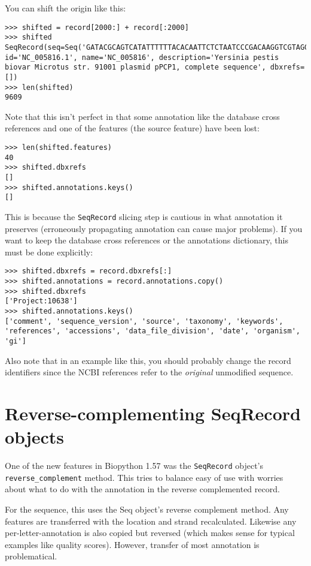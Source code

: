 You can shift the origin like this:

\begin{verbatim}
>>> shifted = record[2000:] + record[:2000]
>>> shifted
SeqRecord(seq=Seq('GATACGCAGTCATATTTTTTACACAATTCTCTAATCCCGACAAGGTCGTAGGTC...GGA'), id='NC_005816.1', name='NC_005816', description='Yersinia pestis biovar Microtus str. 91001 plasmid pPCP1, complete sequence', dbxrefs=[])
>>> len(shifted)
9609
\end{verbatim}

Note that this isn't perfect in that some annotation like the database cross references
and one of the features (the source feature) have been lost:

\begin{verbatim}
>>> len(shifted.features)
40
>>> shifted.dbxrefs
[]
>>> shifted.annotations.keys()
[]
\end{verbatim}

This is because the \verb|SeqRecord| slicing step is cautious in what annotation
it preserves (erroneously propagating annotation can cause major problems). If
you want to keep the database cross references or the annotations dictionary,
this must be done explicitly:

\begin{verbatim}
>>> shifted.dbxrefs = record.dbxrefs[:]
>>> shifted.annotations = record.annotations.copy()
>>> shifted.dbxrefs
['Project:10638']
>>> shifted.annotations.keys()
['comment', 'sequence_version', 'source', 'taxonomy', 'keywords', 'references', 'accessions', 'data_file_division', 'date', 'organism', 'gi']
\end{verbatim}

Also note that in an example like this, you should probably change the record
identifiers since the NCBI references refer to the \emph{original} unmodified
sequence.

\section{Reverse-complementing SeqRecord objects}
\label{sec:SeqRecord-reverse-complement}

One of the new features in Biopython 1.57 was the \verb|SeqRecord| object's
\verb|reverse_complement| method. This tries to balance easy of use with worries
about what to do with the annotation in the reverse complemented record.

For the sequence, this uses the Seq object's reverse complement method. Any
features are transferred with the location and strand recalculated. Likewise
any per-letter-annotation is also copied but reversed (which makes sense for
typical examples like quality scores). However, transfer of most annotation
is problematical.

